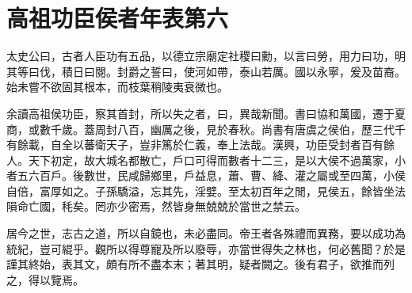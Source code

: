 \onecolumn
\chapter{高祖功臣侯者年表第六}

太史公曰，古者人臣功有五品，以德立宗廟定社稷曰勳，以言曰勞，用力曰功，明其等曰伐，積日曰閱。封爵之誓曰，使河如帶，泰山若厲。國以永寧，爰及苗裔。始未嘗不欲固其根本，而枝葉稍陵夷衰微也。

余讀高祖侯功臣，察其首封，所以失之者，曰，異哉新聞。書曰協和萬國，遷于夏商，或數千歲。蓋周封八百，幽厲之後，見於春秋。尚書有唐虞之侯伯，歷三代千有餘載，自全以蕃衛天子，豈非篤於仁義，奉上法哉。漢興，功臣受封者百有餘人。天下初定，故大城名都散亡，戶口可得而數者十二三，是以大侯不過萬家，小者五六百戶。後數世，民咸歸鄉里，戶益息，蕭、曹、絳、灌之屬或至四萬，小侯自倍，富厚如之。子孫驕溢，忘其先，淫嬖。至太初百年之閒，見侯五，餘皆坐法隕命亡國，秏矣。罔亦少密焉，然皆身無兢兢於當世之禁云。

居今之世，志古之道，所以自鏡也，未必盡同。帝王者各殊禮而異務，要以成功為統紀，豈可緄乎。觀所以得尊寵及所以廢辱，亦當世得失之林也，何必舊聞？於是謹其終始，表其文，頗有所不盡本末；著其明，疑者闕之。後有君子，欲推而列之，得以覽焉。
\twocolumn